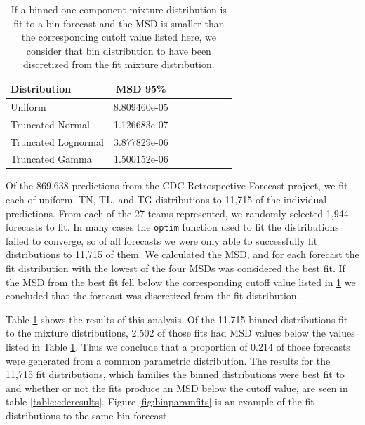 \documentclass[11pt,notitlepage]{isuthesis}
\begin{document}
\begin{table}[h!]
  \centering
  \begin{tabular}{l*{6}{c}r}
  Distribution          & MSD 95\%  \\
  \hline
  Uniform               & 8.809460e-05   \\
  Truncated Normal      & 1.126683e-07  \\
  Truncated Lognormal   & 3.877829e-06  \\
  Truncated Gamma       & 1.500152e-06  \\
  \end{tabular}
  \begin{center}
\begin{minipage}{10cm}
\captionsetup{font=scriptsize}
  \caption[Bin distribution cutoff values]{If a binned 
  one component mixture distribution is fit to a bin forecast
  and the MSD is smaller than
  the corresponding cutoff value listed here, we consider that bin 
  distribution to have been discretized from the fit mixture distribution.}
  \label{table:bincutoffs}
  \end{minipage}
  \end{center}
\end{table}




Of the 869,638 predictions from the CDC Retrospective Forecast project, we fit
each of uniform, TN, TL, and TG distributions to 11,715 of the individual 
predictions. From each of the 27 teams represented, we randomly selected 1,944
forecasts to fit. In many cases the \texttt{optim} function used to fit the 
distributions failed to converge, so of all forecasts we were only able to 
successfully fit distributions to 11,715 of them.
We calculated the MSD, and for each forecast the fit
distribution with the lowest of the four MSDs was considered the best fit. If 
the MSD from the best fit fell
below the corresponding cutoff value listed in \ref{table:bincutoffs} we 
concluded that 
the forecast was discretized from the fit distribution. 

Table \ref{table:bincutoffs} shows the results of this analysis. 
Of the 11,715 binned distributions fit to the mixture distributions,
2,502 of those fits had MSD values below the values listed in Table
\ref{table:bincutoffs}. Thus we conclude that a proportion of 0.214 of those
forecasts were generated from a common parametric distribution. The results for 
the
11,715 fit distributions, which families the binned distributions were best
fit to and whether or not the fits produce an MSD below the cutoff value, 
are seen in table \ref{table:cdcresults}. Figure \ref{fig:binparamfits} is an
example of
the fit distributions to the same bin forecast.
\end{document}
